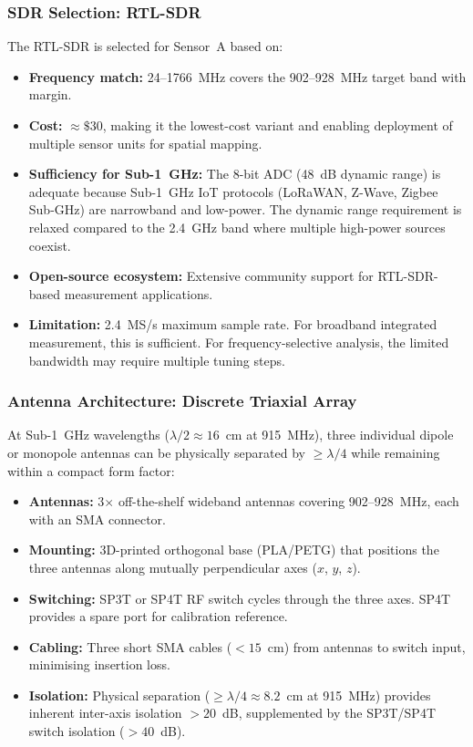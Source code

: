 \documentclass[11pt,a4paper]{article}
\begin{document}
\subsubsection{SDR Selection: RTL-SDR}

The RTL-SDR is selected for Sensor~A based on:

\begin{itemize}
    \item \textbf{Frequency match:} 24--1766~MHz covers the 902--928~MHz target band with margin.
    \item \textbf{Cost:} $\approx \$30$, making it the lowest-cost variant and enabling deployment of multiple sensor units for spatial mapping.
    \item \textbf{Sufficiency for Sub-1~GHz:} The 8-bit ADC (48~dB dynamic range) is adequate because Sub-1~GHz IoT protocols (LoRaWAN, Z-Wave, Zigbee Sub-GHz) are narrowband and low-power. The dynamic range requirement is relaxed compared to the 2.4~GHz band where multiple high-power sources coexist.
    \item \textbf{Open-source ecosystem:} Extensive community support for RTL-SDR-based measurement applications.
    \item \textbf{Limitation:} 2.4~MS/s maximum sample rate. For broadband integrated measurement, this is sufficient. For frequency-selective analysis, the limited bandwidth may require multiple tuning steps.
\end{itemize}

\subsubsection{Antenna Architecture: Discrete Triaxial Array}

At Sub-1~GHz wavelengths ($\lambda/2 \approx 16$~cm at 915~MHz), three individual dipole or monopole antennas can be physically separated by $\geq \lambda/4$ while remaining within a compact form factor:

\begin{itemize}
    \item \textbf{Antennas:} 3$\times$ off-the-shelf wideband antennas covering 902--928~MHz, each with an SMA connector.
    \item \textbf{Mounting:} 3D-printed orthogonal base (PLA/PETG) that positions the three antennas along mutually perpendicular axes ($x$, $y$, $z$).
    \item \textbf{Switching:} SP3T or SP4T RF switch cycles through the three axes. SP4T provides a spare port for calibration reference.
    \item \textbf{Cabling:} Three short SMA cables ($< 15$~cm) from antennas to switch input, minimising insertion loss.
    \item \textbf{Isolation:} Physical separation ($\geq \lambda/4 \approx 8.2$~cm at 915~MHz) provides inherent inter-axis isolation $> 20$~dB, supplemented by the SP3T/SP4T switch isolation ($> 40$~dB).
\end{itemize}
\end{document}
